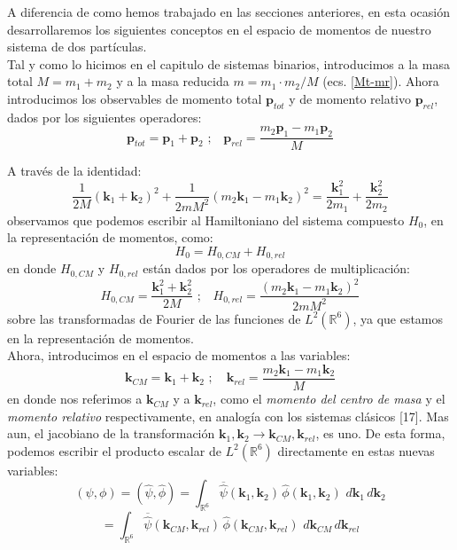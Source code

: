 \documentclass[12pt]{book}
\numberwithin{equation}{chapter}
\def\ol{\overline}
\def\R{\mathbb{R}}
\def\rar{\rightarrow}
\def\k{\mathbf{k}}
\def\P{\mathbf{p}}
\begin{document}
A diferencia de como hemos trabajado en las secciones anteriores, en esta ocasi\'on desarrollaremos los siguientes conceptos en el espacio de momentos de nuestro sistema de dos part\'iculas.\\

Tal y como lo hicimos en el capitulo de sistemas binarios, introducimos a la masa total $M=m_{1}+m_{2}$ y a la masa reducida $m= m_{1} \cdot m_{2}/M $ (ecs. \eqref{Mt-mr}). Ahora introducimos los observables de momento total $\P_{tot}$ y de momento relativo $\P_{rel}$, dados por los siguientes operadores:
\begin{equation}
\P_{tot}= \P_{1}+\P_{2} \,\,;\,\,\,\,\, \P_{rel} = \frac{ m_{2}\P_{1} - m_{1}\P_{2} }{M}
\end{equation}

A trav\'es de la identidad:
$$ \frac{1}{2M} ( \k_{1}+\k_{2} )^{2} + \frac{1}{2m M^{2}} ( m_{2}\k_{1} - m_{1}\k_{2} )^{2}= \frac{\k_{1}^{2}}{2m_{1}} + \frac{ \k_{2}^{2} }{2m_{2}} $$
observamos que podemos escribir al Hamiltoniano del sistema compuesto $H_{0}$, en la representaci\'on de momentos, como:
\begin{equation}\label{H-cm-rel}
H_{0}= H_{0,CM} + H_{0,rel}
\end{equation}
en donde $H_{0,CM}$ y $H_{0,rel}$ est\'an dados por los operadores de multiplicaci\'on:
\begin{equation}
H_{0,CM}= \frac{ \k_{1}^{2} + \k_{2}^{2} }{2M} \,\,;\,\,\,\,\, H_{0,rel}= \frac{( m_{2}\k_{1} - m_{1}\k_{2} )^{2}}{ 2 m M^{2} } 
\end{equation}
sobre las transformadas de Fourier de las funciones de $L^{2}(\R^{6})$, ya que estamos en la representaci\'on de momentos.\\

Ahora, introducimos en el espacio de momentos a las variables:
\begin{equation}\label{K-cm-rel}
\k_{CM}= \k_{1}+\k_{2} \,\,;\,\,\,\,\,\, \k_{rel}= \frac{m_{2}\k_{1}-m_{1}\k_{2}}{M}
\end{equation}
en donde nos referimos a $\k_{CM}$ y a $\k_{rel}$, como el \emph{momento del centro de masa} y el \emph{momento relativo} respectivamente, en analog\'ia con los sistemas cl\'asicos [17]. Mas aun, el jacobiano de la transformaci\'on $ \k_{1},\k_{2} \rar \k_{CM},\k_{rel} $, es uno. De esta forma, podemos escribir el producto escalar de $L^{2}(\R^{6})$ directamente en estas nuevas variables:
$$ (\psi,\phi)= ( \hat{\psi},\hat{\phi} ) =\int_{\R^{6}} \ol{\hat{\psi}}(\k_{1},\k_{2}) \, \hat{\phi}(\k_{1},\k_{2})\,\, d\k_{1}\, d\k_{2} $$
$$ = \int_{\R^{6}} \ol{\hat{\psi}}(\k_{CM},\k_{rel}) \, \hat{\phi}(\k_{CM},\k_{rel})\,\, d\k_{CM}\, d\k_{rel} $$
\end{document}
